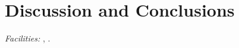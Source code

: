 \documentclass[12pt,preprint]{aastex}
\begin{document}
 

\section{Discussion and Conclusions} 

 


\acknowledgments






{\it Facilities:} , .



%
\end{document}
